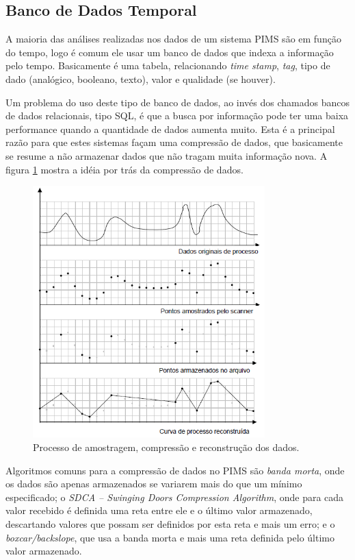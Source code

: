 \subsection{Banco de Dados Temporal}
A maioria das análises realizadas nos dados de um sistema PIMS são em função do tempo, logo é comum ele usar um banco de dados que indexa a informação pelo tempo. Basicamente é uma tabela, relacionando \emph{time stamp}, \emph{tag}, tipo de dado (analógico, booleano, texto), valor e qualidade (se houver).

Um problema do uso deste tipo de banco de dados, ao invés dos chamados bancos de dados relacionais, tipo SQL, é que a busca por informação pode ter uma baixa performance quando a quantidade de dados aumenta muito. Esta é a principal razão para que estes sistemas façam uma compressão de dados, que basicamente se resume a não armazenar dados que não tragam muita informação nova. A figura \ref{fig:reconstrucaoDados} mostra a idéia por trás da compressão de dados.

\begin{figure}[hbt]
	\begin{center}
		\includegraphics[width=0.8\textwidth]{figuras/reconstrucaoDados}
	\end{center}
	\caption{Processo de amostragem, compressão e reconstrução dos dados.} %
	\label{fig:reconstrucaoDados}
\end{figure}

Algoritmos comuns para a compressão de dados no PIMS são \emph{banda morta}, onde os dados são apenas armazenados se variarem mais do que um mínimo especificado; o \emph{SDCA -- Swinging Doors Compression Algorithm}, onde para cada valor recebido é definida uma reta entre ele e o último valor armazenado, descartando valores que possam ser definidos por esta reta e mais um erro; e o \emph{boxcar/backslope}, que usa a banda morta e mais uma reta definida pelo último valor armazenado. %

